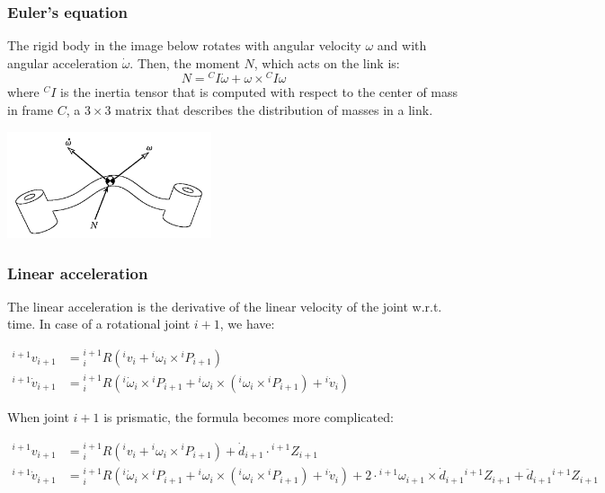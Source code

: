 \subsubsection{Euler's equation}
The rigid body in the image below rotates with angular velocity $ \omega $ and with angular acceleration $ \dot{ \omega} $. Then, the moment $ N $, which acts on the link is:
 \[ N = {}^{C} I \dot{\omega } + \omega \times {}^{C} I \omega \]
where $ {}^{C} I $ is the inertia tensor that is computed with respect to the center of mass in frame $C$, a $3\times3$ matrix that describes the distribution of masses in a link. \begin{center}
	\includegraphics[width=6cm]{sections/imgs/37.png}
\end{center}

\subsubsection{Linear acceleration}
The linear acceleration is the derivative of the linear velocity of the joint w.r.t. time. In case of a rotational joint $i+1$, we have:
\begin{center}
$\begin{aligned}
{}^{i+1} v_{i+1} &= {}^{i+1}_{i} R ({}^{i} v_{i} + {}^{i} \omega_{i} \times {}^{i} P_{i+1})\\
{ }^{i+1} \dot{v}_{i+1}&={ }_{i}^{i+1} R\left({ }^{i} \dot{\omega}_{i} \times{ }^{i} P_{i+1}+{ }^{i} \omega_{i} \times\left({ }^{i} \omega_{i} \times{ }^{i} P_{i+1}\right)+{ }^{i} \dot{v}_{i}\right)
\end{aligned}$
\end{center}

When joint $i+1$ is prismatic, the formula becomes more complicated:

\begin{center}
$\begin{aligned}
{}^{i+1} v_{i+1} &= {}^{i+1}_{i} R ({}^{i} v_{i} + {}^{i} \omega_{i} \times {}^{i} P_{i+1}) + \dot{d}_{i+1} \cdot {}^{i+1} \hat{Z}_{i+1} \\
{ }^{i+1} \dot{v}_{i+1}&={ }_{i}^{i+1} R\left({ }^{i} \dot{\omega}_{i} \times{ }^{i} P_{i+1}+{ }^{i} \omega_{i} \times\left({ }^{i} \omega_{i} \times{ }^{i} P_{i+1}\right)+{ }^{i} \dot{v}_{i}\right)+2 \cdot{ }^{i+1} \omega_{i+1} \times \dot{d}_{i+1}{ }^{i+1} Z_{i+1}+\ddot{d}_{i+1}{ }^{i+1} Z_{i+1}
\end{aligned}$
\end{center}

